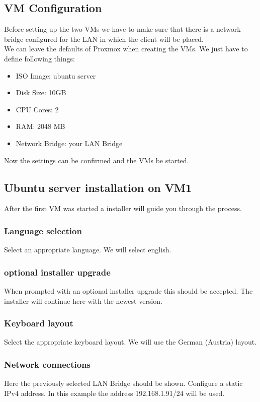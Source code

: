 \documentclass[10pt,a4paper]{article}
\begin{document}
\subsection{VM Configuration}
Before setting up the two VMs we have to make sure that there is a network bridge configured for the LAN in which the client will be placed.
\\
We can leave the defaults of Proxmox when creating the VMs. We just have to define following things:
\begin{itemize}
\item ISO Image: ubuntu server
\item Disk Size: 10GB
\item CPU Cores: 2
\item RAM: 2048 MB
\item Network Bridge: your LAN Bridge
\end{itemize}
Now the settings can be confirmed and the VMs be started.

\subsection{Ubuntu server installation on VM1}
\label{serverinstallation}
After the first VM was started a installer will guide you through the process.

\subsubsection{Language selection}
Select an appropriate language. We will select english.

\subsubsection{optional installer upgrade}
When prompted with an optional installer upgrade this should be accepted. The installer will continue here with the newest version.

\subsubsection{Keyboard layout}
Select the appropriate keyboard layout. We will use the German (Austria) layout.

\subsubsection{Network connections}
\label{networkconnections}
Here the previously selected LAN Bridge should be shown. Configure a static IPv4 address. In this example the address 192.168.1.91/24 will be used. 
\end{document}

